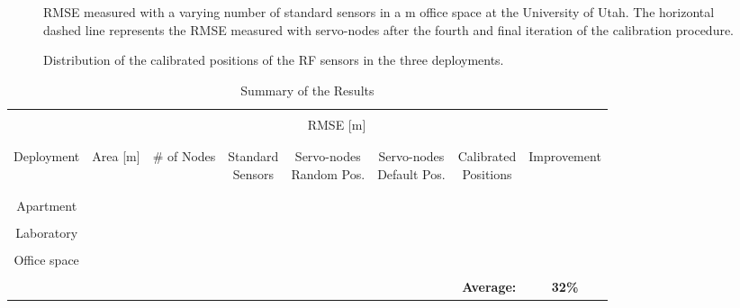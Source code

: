 \documentclass[conference]{IEEEtran}
\begin{document}
\begin{figure}
    \begin{center}
        \caption{RMSE measured with a varying number of standard sensors in a  m office space at the University of Utah. The horizontal dashed line represents the RMSE measured with  servo-nodes after the fourth and final iteration of the calibration procedure.}
        \label{fig:large_room_sims_more_nodes}
    \end{center}
\end{figure}

\begin{figure}
    \begin{center}
        \caption{Distribution of the calibrated positions of the RF sensors in the three deployments.}
        \label{fig:sensors_pos_distr}
    \end{center}
\end{figure}



\begin{center}
\begin{table*}[t!]
    \caption{Summary of the Results} \centering
        \footnotesize
        \begin{tabular}{c  c  c | c  c  c  c | c}
        \hline\hline \\ [-2.0ex]
        &  &  & \multicolumn{3}{c}{RMSE [m]} & \\
        \\ [-2.0ex]
        \hline
        \\ [-2.0ex]
        Deployment & Area [m] & \# of Nodes & \shortstack{Standard\\Sensors} & \shortstack{Servo-nodes\\Random Pos.} & \shortstack{Servo-nodes\\Default Pos.} & \shortstack{Calibrated\\Positions} & Improvement\\
        \\ [-2.0ex]
        \hline
        \\ [-2.0ex]
        Apartment    &   &  &  &        &        &  & \\ \\ [-2.0ex]
        Laboratory   &   &  &  &  &  &  & \\ \\ [-2.0ex]
        Office space &  &  &  &  &  &  & \\ \\ [-2.0ex]
        \hline \multicolumn{5}{c}{} & \multicolumn{2}{r|}{\bf Average:} & \bf 32\% \\
        \end{tabular}
        \label{T:results_summary}
\end{table*}
\end{center}
\end{document}
